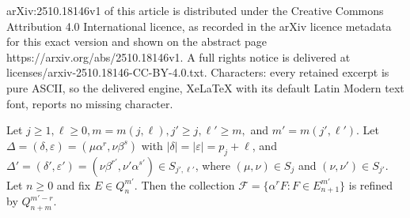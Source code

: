 \documentclass[10pt,a4paper]{amsart}
\newcommand{\De}{\Delta}
\newcommand{\al}{\alpha}
\newcommand{\be}{\beta}
\newcommand{\de}{\delta}
\newcommand{\ep}{\varepsilon}
\newcommand{\mc}[1]{\mathcal{#1}}
\begin{document}
arXiv:2510.18146v1 of this article is distributed under the Creative Commons Attribution 4.0 International licence, as recorded in the arXiv licence metadata for this exact version and shown on the abstract page https://arxiv.org/abs/2510.18146v1. A full rights notice is delivered at licenses/arxiv-2510.18146-CC-BY-4.0.txt. Characters: every retained excerpt is pure ASCII, so the delivered engine, XeLaTeX with its default Latin Modern text font, reports no missing character.
\begin{Proposition}\label{prop F is refined by (c=beta)}
    Let $j \geq 1, \ell \geq 0, m = m(j,\ell), j' \geq j, \ell' \ge m,$ and $m' = m(j', \ell')$. Let $\De = (\de, \ep) =(\mu\al^r, \nu\be^s) $ with $|\de| = |\ep| = p_j + \ell$, and $\De' = (\de', \ep') = (\nu\be^{r'}, \nu' \al^{s'}) \in S_{j',\ell'}$, where $(\mu, \nu) \in S_j$ and $(\nu, \nu') \in S_{j'}$. Let $n \geq 0$ and fix $E \in Q_n^{m'}$.  Then the collection $\mc{F} = \{\al^r F : F \in E_{n+1}^{m'} \}$ is refined by $Q_{n+m}^{m'-r}$.
\end{Proposition}
\end{document}
